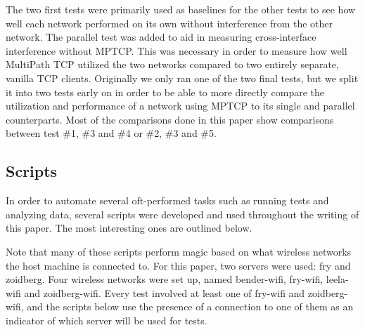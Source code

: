 \documentclass[12pt,a4paper]{article}
\begin{document}
The two first tests were primarily used as baselines for the other tests to see
how well each network performed on its own without interference from the other
network. The parallel test was added to aid in measuring cross-interface
interference without MPTCP. This was necessary in order to measure how well
MultiPath TCP utilized the two networks compared to two entirely separate,
vanilla TCP clients. Originally we only ran one of the two final tests, but we
split it into two tests early on in order to be able to more directly compare
the utilization and performance of a network using MPTCP to its single and
parallel counterparts. Most of the comparisons done in this paper show
comparisons between test \#1, \#3 and \#4 or \#2, \#3 and \#5.
\subsection{Scripts}
In order to automate several oft-performed tasks such as running tests and
analyzing data, several scripts were developed and used throughout the writing
of this paper. The most interesting ones are outlined below.

Note that many of these scripts perform magic based on what wireless networks
the host machine is connected to. For this paper, two servers were used: fry and
zoidberg. Four wireless networks were set up, named bender-wifi, fry-wifi,
leela-wifi and zoidberg-wifi. Every test involved at least one of fry-wifi and
zoidberg-wifi, and the scripts below use the presence of a connection to one of
them as an indicator of which server will be used for tests.
\end{document}
